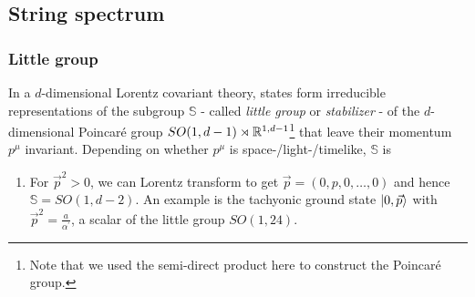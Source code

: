 \subsection{String spectrum}
\subsubsection{Little group}
In a $d$-dimensional Lorentz covariant theory, states form irreducible representations of the subgroup $\mathbb{S}$ - called \emph{little group} or \emph{stabilizer} - of the $d$-dimensional Poincaré group $SO(1,d-1)\rtimes \mathbb{R}^{1,d-1}$\footnote{Note that we used the semi-direct product here to construct the Poincaré group.} that leave their momentum $p^\mu$ invariant. Depending on whether $p^\mu$ is space-/light-/timelike, $\mathbb{S}$ is 
\begin{enumerate}
	\item For $\vec{p}^2>0$, we can Lorentz transform to get $\vec{p}=(0,p,0,\dots,0)$ and hence $\mathbb{S}=SO(1,d-2)$. An example is the tachyonic ground state $\ket{0,\vec{p}}$ with $\vec{p}^2= \frac{a}{\alpha^\prime}$, a scalar of the little group $SO(1,24)$.
\end{enumerate}







































